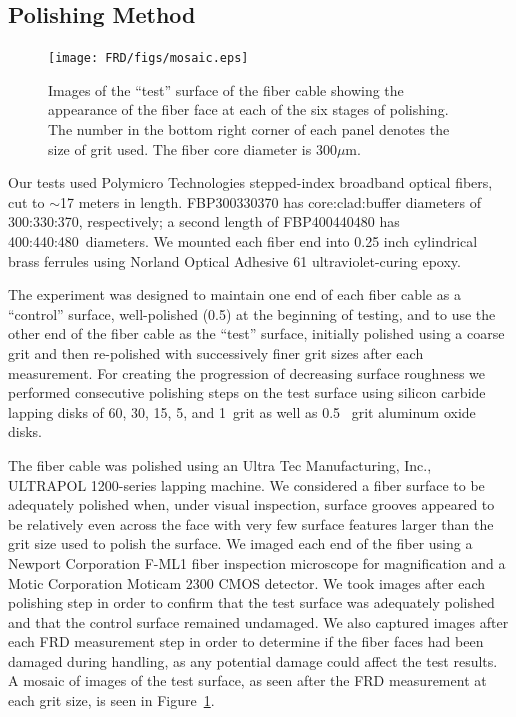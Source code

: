 \subsection{Polishing Method}
\begin{figure}[ht]
    \texttt{[image: FRD/figs/mosaic.eps]}
    \caption{\fixspacing Images of the ``test'' surface of the fiber cable showing
      the appearance of the fiber face at each of the six stages of
      polishing. The number in the bottom right corner of each panel
      denotes the size of grit used. The fiber core diameter is
      300$\mu$m.\label{fig:mosaic}}
\end{figure}

Our tests used Polymicro Technologies stepped-index broadband optical
fibers, cut to $\sim$17 meters in length.  FBP300330370 has
core:clad:buffer diameters of 300:330:370\mum, respectively; a second
length of FBP400440480 has 400:440:480\mum\ diameters.  We mounted
each fiber end into 0.25 inch cylindrical brass ferrules using Norland
Optical Adhesive 61 ultraviolet-curing epoxy.

The experiment was designed to maintain one end of each fiber cable as
a ``control'' surface, well-polished (0.5\mum) at the beginning of
testing, and to use the other end of the fiber cable as the ``test''
surface, initially polished using a coarse grit and then re-polished
with successively finer grit sizes after each measurement.  For
creating the progression of decreasing surface roughness we performed
consecutive polishing steps on the test surface using silicon carbide
lapping disks of 60, 30, 15, 5, and 1\mum\ grit as well as 0.5
\mum\ grit aluminum oxide disks.

The fiber cable was polished using an Ultra Tec Manufacturing, Inc.,
ULTRAPOL 1200-series lapping machine.  We considered a fiber surface
to be adequately polished when, under visual inspection, surface
grooves appeared to be relatively even across the face with very few
surface features larger than the grit size used to polish the surface.
We imaged each end of the fiber using a Newport Corporation F-ML1
fiber inspection microscope for magnification and a Motic Corporation
Moticam 2300 CMOS detector.  We took images after each polishing step
in order to confirm that the test surface was adequately polished and
that the control surface remained undamaged.  We also captured images
after each FRD measurement step in order to determine if the fiber
faces had been damaged during handling, as any potential damage could
affect the test results.  A mosaic of images of the test surface, as
seen after the FRD measurement at each grit size, is seen in
Figure~\ref{fig:mosaic}.


